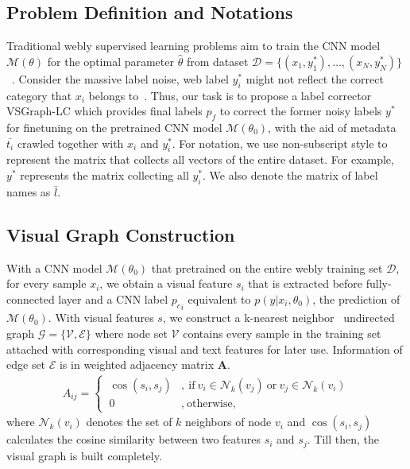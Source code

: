 \documentclass[sigconf]{acmart}
\begin{document}
\subsection{Problem Definition and Notations}
\label{S:problem}
Traditional webly supervised learning problems aim to train the CNN model $\mathcal{M(\theta)}$ for the optimal parameter $\hat{\theta}$ from dataset $\mathcal{D}=\{(x_1, y^*_1),\dots,(x_N, y^*_N)\}$~\cite{li2017webvision}.
Consider the massive label noise, web label $y_i^*$ might not reflect the correct category that $x_i$ belongs to~\cite{xiao2015learning}.
Thus, our task is to propose a label corrector VSGraph-LC which provides final labels $p_f$ to correct the former noisy labels $y^*$ for finetuning on the pretrained CNN model $\mathcal{M}{(\theta_0)}$, with the aid of metadata $\bar{t_i}$ crawled together with $x_i$ and $y^*_i$.
For notation, we use non-subscript style to represent the matrix that collects all vectors of the entire dataset. For example, $y^*$ represents the matrix collecting all $y^*_i$.
We also denote the matrix of label names as $\bar{l}$.

\subsection{Visual Graph Construction}
With a CNN model $\mathcal{M}{(\theta_0)}$ that pretrained on the entire webly training set $\mathcal{D}$, for every sample $x_i$, we obtain a visual feature $s_i$ that is extracted before fully-connected layer and a CNN label ${p_c}_i$ equivalent to $p(y|x_i,\theta_0)$, the prediction of $\mathcal{M}{(\theta_0)}$. With visual features $s$, we construct a k-nearest neighbor~\cite{dudani1976distance} undirected graph $\mathcal{G}=\{\mathcal{V}, \mathcal{E}\}$ where node set $\mathcal{V}$ contains every sample in the training set attached with corresponding visual and text features for later use. Information of edge set $\mathcal{E}$ is in weighted adjacency matrix $\mathbf{A}$.
\begin{equation}
\label{E:adj}
\begin{aligned}
A_{ij} =
\begin{cases}
~\cos(s_i, s_j) &, ~ \text{if}~v_i \in \mathcal{N}_k(v_j) ~\text{or}~ v_j \in \mathcal{N}_k(v_i)\\
~0 				   &, ~ \text{otherwise,}
\end{cases}
\end{aligned}
\end{equation}
where $\mathcal{N}_k(v_i)$ denotes the set of $k$ neighbors of node $v_i$ and $\cos(s_i,s_j)$ calculates the cosine similarity between two features $s_i$ and $s_j$. Till then, the visual graph is built completely.
	
\end{document}
